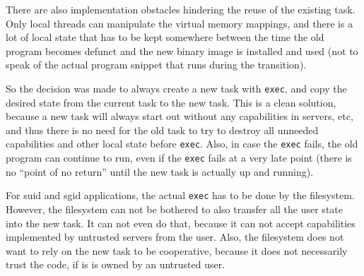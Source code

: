 \begin{comment}
  One could think that if a program is not Hurd-aware, then it will
  not make any use of capabilities except through the normal POSIX
  API, and thus there are no capabilities except those that the GNU C
  library uses itself, which \texttt{exec} can take care of.
  However, this is only true if code that is not Hurd-aware is never
  mixed with Hurd specific code, even libraries (unless the library
  intimately cooperates with the GNU C library).  This would be a high
  barrier to enable Hurd features in otherwise portable programs and
  libraries.
  
  It is better to make all POSIX functions safe by default and allow
  for extensions to let the user specify which capabilities besides
  those used for file descriptors etc to be inherited by the new
  executable.
  
  For \verb/posix_spawn()/, this is straight-forward.  For
  \texttt{exec}, it is not. either specific capabilities could be
  markes as ``do not close on \texttt{exec}'', or variants of the
  \texttt{exec} function could be provided which take further
  arguments.
\end{comment}

There are also implementation obstacles hindering the reuse of the
existing task.  Only local threads can manipulate the virtual memory
mappings, and there is a lot of local state that has to be kept
somewhere between the time the old program becomes defunct and the new
binary image is installed and used (not to speak of the actual program
snippet that runs during the transition).

So the decision was made to always create a new task with
\texttt{exec}, and copy the desired state from the current task to the
new task.  This is a clean solution, because a new task will always
start out without any capabilities in servers, etc, and thus there is
no need for the old task to try to destroy all unneeded capabilities
and other local state before \texttt{exec}.  Also, in case the
\texttt{exec} fails, the old program can continue to run, even if the
\texttt{exec} fails at a very late point (there is no ``point of no
return'' until the new task is actually up and running).

For suid and sgid applications, the actual \texttt{exec} has to be
done by the filesystem.  However, the filesystem can not be bothered
to also transfer all the user state into the new task.  It can not
even do that, because it can not accept capabilities implemented by
untrusted servers from the user.  Also, the filesystem does not want
to rely on the new task to be cooperative, because it does not
necessarily trust the code, if is is owned by an untrusted user.

